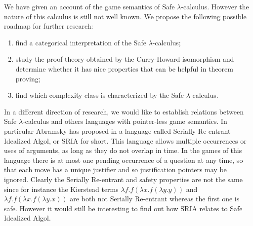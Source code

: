 We have given an account of the game semantics of Safe $\lambda$-calculus. However the nature of this calculus
is still not well known. We propose the following possible roadmap for further research:
\begin{enumerate}
\item find a categorical interpretation of the Safe $\lambda$-calculus;
\item study the proof theory obtained by the Curry-Howard isomorphism and determine whether it has nice properties that can be helpful in theorem proving;
\item find which complexity class is characterized by the Safe-$\lambda$ calculus.
\end{enumerate}

In a different direction of research, we would like to establish relations between
Safe $\lambda$-calculus and others languages with pointer-less game semantics.
In particular Abramsky has proposed in \cite{abramsky:mchecking_ia} a language
called Serially Re-entrant Idealized Algol, or SRIA for short. This
language allows multiple occurrences or uses of arguments, as long
as they do not overlap in time. In the games of this language there
is at most one pending occurrence of a question at any time, so that
each move has a unique justifier and so justification pointers may
be ignored.
Clearly the Serially Re-entrant and safety properties are not the same since for instance the Kierstead terms
$\lambda f . f (\lambda x . f (\lambda y .y ))$ and
$\lambda f . f (\lambda x . f (\lambda y .x ))$ are both not Serially Re-entrant whereas the first one is safe.
However it would still be interesting to find out how SRIA relates to Safe Idealized Algol.
